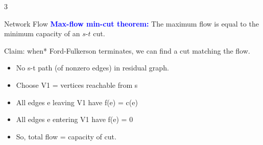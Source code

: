 \documentclass[10pt,a4paper]{article}
\begin{document}
\begin{multicols}{3}
\begin{textbox}{Network Flow}
    \textcolor{blue}{{\bf Max-flow min-cut theorem:}} The maximum flow is equal to the minimum capacity of an $s$-$t$ cut.
    
    \smallskip
    Claim: when* Ford-Fulkerson terminates, we can find a cut matching the flow.
    \begin{itemize}
        \item No s-t path (of nonzero edges) in residual graph.
        \item Choose V1 = {vertices reachable from s}
        \item All edges e leaving V1 have f(e) = c(e)
        \item All edges e entering V1 have f(e) = 0
        \item So, total flow = capacity of cut.
    \end{itemize}

\end{textbox}

\end{multicols}
\end{document}
